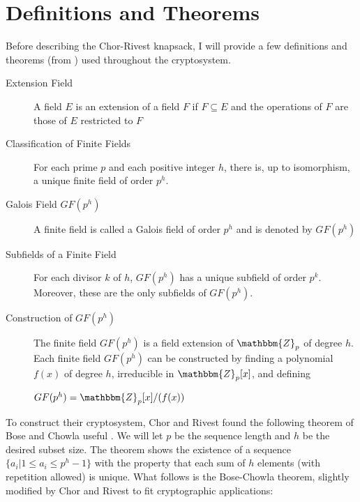 \documentclass[12pt,a4paper,titlepage]{article}
\begin{document}
\section{Definitions and Theorems}

Before describing the Chor-Rivest knapsack, I will provide a few definitions and theorems (from \cite{modern:6}) used throughout the cryptosystem. 

\begin{description}

\item [Extension Field] A field $E$ is an extension of a field $F$ if $F \subseteq E $ and the operations of $F$ are those of $E$ restricted to $F$

\item [Classification of Finite Fields] For each prime $p$ and each positive integer $h$, there is, up to isomorphism, a unique finite field of order $p^h$.\\

\item [Galois Field $GF(p^h)$] A finite field is called a Galois field of order $p^h$ and is denoted by $GF(p^h)$

\item [Subfields of a Finite Field] For each divisor $k$ of $h$, $GF(p^h)$ has a unique subfield of order $p^k$. Moreover, these are the only subfields of $GF(p^h)$.


\item [Construction of $GF(p^h)$] The finite field $GF(p^h)$ is a field extension of $\mathbbm{Z}_p$ of degree $h$. Each finite field $GF(p^h)$ can be constructed by finding a polynomial $f(x)$ of degree $h$, irreducible in $\mathbbm{Z}_p [x]$, and defining \\ \centerline{$GF(p^h) = \mathbbm{Z}_p[x] / (f(x))$}

\end{description}


\par To construct their cryptosystem, Chor and Rivest found the following theorem of Bose and Chowla useful \cite{Chor84:1} . We will let $p$ be the sequence length and $h$ be the desired subset size. The theorem shows the existence of a sequence \\ $\{ a_i | 1 \le a_i \le p^h - 1\}$ with the property that each sum of $h$ elements (with repetition allowed) is unique. What follows is the Bose-Chowla theorem, slightly modified by Chor and Rivest to fit cryptographic applications:
\end{document}
